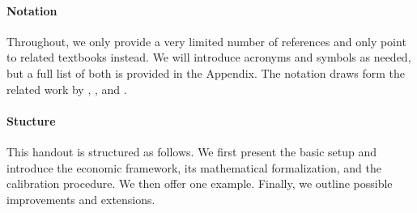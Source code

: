 \paragraph{Notation} Throughout, we only provide a very limited number of references and only point to related textbooks instead. We will introduce acronyms and symbols as needed, but a full list of both is provided in the Appendix. The notation draws form the related work by \cite{Puterman.1994}, \cite{Aguirregabiria.2010}, and \cite{Arcidiacono.2011}.

\paragraph{Stucture} This handout is structured as follows. We first present the basic setup and introduce the economic framework, its mathematical formalization, and the calibration procedure. We then offer one example. Finally, we outline possible improvements and extensions.
